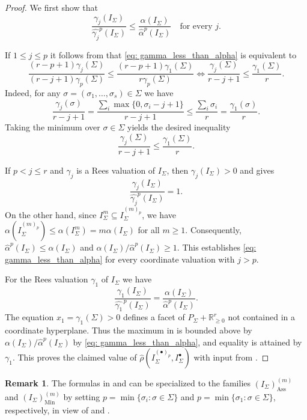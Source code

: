 \documentclass[11pt, reqno]{amsart}
\numberwithin{equation}{section}
\theoremstyle{definition}
\newtheorem{remark}[theorem]{Remark}
\DeclareMathOperator{\Ass}{Ass}
\DeclareMathOperator{\Min}{Min}
\newcommand{\s}{\sigma}
\begin{document}
\begin{proof}
We first show that
\begin{equation}\label{eq: gamma_less_than_alpha}
\frac{\gamma_j(I_\Sigma)}{\widehat{\gamma_j}^p(I_\Sigma)}\leq \frac{\alpha(I_\Sigma)}{\widehat{\alpha}^{p}(I_\Sigma)}
\quad \text{for every $j$}.
\end{equation}

If $1\leq j \leq p$ it follows from  that \eqref{eq: gamma_less_than_alpha} is equivalent to
\[
\frac{(r-p+1)\gamma_j(\Sigma)}{(r-j+1)\gamma_{p}(\Sigma)} \leq \frac{(r-p+1)\gamma_1(\Sigma)}{r\gamma_{p}(\Sigma)}
\iff
\frac{\gamma_j(\Sigma)}{r-j+1}\leq\frac{\gamma_1(\Sigma)}{r}.
\]
Indeed, for any $\sigma=(\sigma_1,\dots,\sigma_s)\in\Sigma$  we have
\[
\frac{\gamma_j(\sigma)}{r-j+1}=\frac{\sum_{i}\max\{0,\s_i-j+1\}}{r-j+1}\le \frac{\sum_{i}\s_i }{r}=\frac{\gamma_1(\sigma)}{r}.
\]
Taking the minimum over $\sigma\in\Sigma$ yields the desired inequality
\[
\frac{\gamma_j(\Sigma)}{r-j+1}\le \frac{\gamma_1(\Sigma)}{r}.
\]

If $p < j \leq r$ and $\gamma_j$ is a Rees valuation of $I_\Sigma$, then $\gamma_j(I_\Sigma)>0$ and  gives
\[
\frac{\gamma_j(I_\Sigma)}{\widehat{\gamma_j}^p(I_\Sigma)}=1.
\]
On the other hand, since $I_\Sigma^{m}\subseteq I_\Sigma^{(m)_p}$, we have $\alpha(I_\Sigma^{(m)_p})\leq \alpha(I_\Sigma^m)=m\alpha(I_\Sigma)$ for all $m\geq 1$. Consequently, $\widehat{\alpha}^p(I_\Sigma)\leq \alpha(I_\Sigma)$ and
$\alpha(I_\Sigma)/\widehat{\alpha}^p(I_\Sigma)\geq 1$. This establishes \eqref{eq: gamma_less_than_alpha} for every coordinate  valuation with $j>p$.

For the Rees valuation $\gamma_1$  of $I_\Sigma$ we have
\[
\frac{\gamma_1(I_\Sigma)}{\widehat{\gamma_1}^{\,p}(I_\Sigma)}
=\frac{\alpha(I_\Sigma)}{\widehat{\alpha}^{p}(I_\Sigma)}.
\]
The equation $x_1=\gamma_1(\Sigma)>0$ defines a  facet of $P_\Sigma+\mathbb R_{\geq0}^r$ not contained in a coordinate hyperplane. Thus the maximum in  is bounded above by $\alpha(I_\Sigma)/\widehat{\alpha}^{p}(I_\Sigma)$ by \eqref{eq: gamma_less_than_alpha}, and equality is attained by $\gamma_1$. This proves the claimed value of
$\widehat{\rho}(I_\Sigma^{(\bullet)_p},I_\Sigma^\bullet)$ with input from .
\end{proof}

\begin{remark}
The formulas in  and  can be specialized to the families $(I_\Sigma)_{\Ass}^{(m)}$ and $(I_\Sigma)_{\Min}^{(m)}$ by setting $p=\min\{\s_i : \s\in \Sigma\}$ and $p=\min\{\s_1 : \s\in \Sigma\}$, respectively, in view of  and .
\end{remark}
\end{document}
